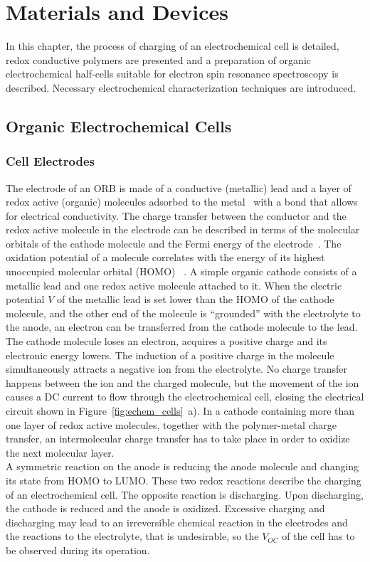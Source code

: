 \chapter{Materials and Devices}
\label{ch:materials}
In this chapter, the process of charging of an electrochemical cell is detailed, redox conductive polymers are presented and a preparation of organic electrochemical half-cells suitable for electron spin resonance spectroscopy is described. Necessary electrochemical characterization techniques are introduced.

\section{Organic Electrochemical Cells}


\subsection{Cell Electrodes}
The electrode of an ORB is made of a conductive (metallic) lead and a layer of redox active (organic) molecules adsorbed to the metal~\cite{Boiziau1988} with a bond that allows for electrical conductivity. The charge transfer between the conductor and the redox active molecule in the electrode can be described in terms of the molecular orbitals of the cathode molecule and the Fermi energy of the electrode~\cite{DOM,Wu_2023,Boiziau1988}. The oxidation potential of a molecule correlates with the energy of its highest unoccupied molecular orbital (HOMO) ~\cite{Sworakowski2018,Wu_2023}. A simple organic cathode consists of a metallic lead and one redox active molecule attached to it. When the electric potential $V$ of the metallic lead is set lower than the HOMO of the cathode molecule, and the other end of the molecule is ``grounded'' with the electrolyte to the anode, an electron can be transferred from the cathode molecule to the lead. The cathode molecule loses an electron, acquires a positive charge and its electronic energy lowers. The induction of a positive charge in the molecule simultaneously attracts a negative ion from the electrolyte. No charge transfer happens between the ion and the charged molecule, but the movement of the ion causes a DC current to flow through the electrochemical cell, closing the electrical circuit shown in Figure~\ref{fig:echem_cells}~a). In a cathode containing more than one layer of redox active molecules, together with the polymer-metal charge transfer, an intermolecular charge transfer has to take place in order to oxidize the next molecular layer.\\ 
A symmetric reaction on the anode is reducing the anode molecule and changing its state from HOMO to LUMO. These two redox reactions describe the charging of an electrochemical cell. The opposite reaction is discharging. Upon discharging, the cathode is reduced and the anode is oxidized. Excessive charging and discharging may lead to an irreversible chemical reaction in the electrodes and the reactions to the electrolyte, that is undesirable, so the $V_{OC}$ of the cell has to be observed during its operation.\\


